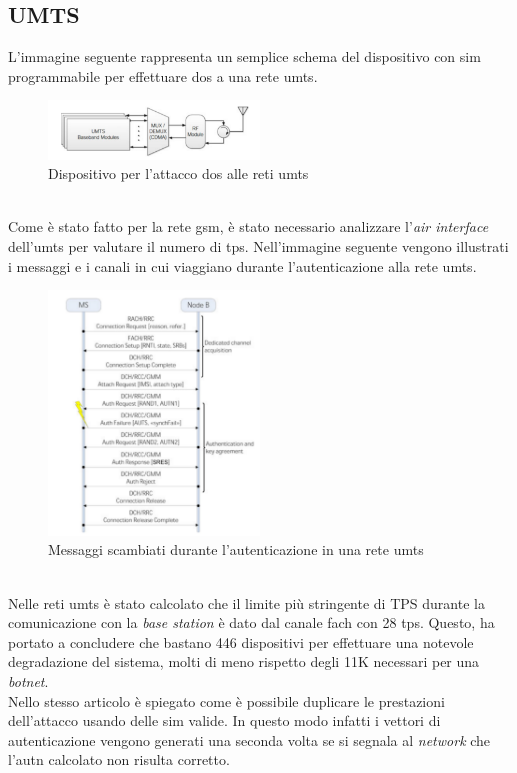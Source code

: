 \subsection{UMTS}
L'immagine seguente rappresenta un semplice schema del dispositivo con \gls{sim} programmabile per effettuare \gls{dos} a una rete \gls{umts}\cite{umts-dos}.
\begin{figure}[h]
    \centering
    \includegraphics[width=0.5\textwidth]{images/umts-dos-device.png}
    \caption{Dispositivo per l'attacco \gls{dos} alle reti \gls{umts}\cite{umts-dos}}
\end{figure}\\
Come è stato fatto per la rete \gls{gsm}, è stato necessario analizzare l'\textit{air interface} dell'\gls{umts} per valutare il numero di \gls{tps}.
Nell'immagine seguente vengono illustrati i messaggi e i canali in cui viaggiano durante l'autenticazione alla rete \gls{umts}.
\begin{figure}[h]
    \centering
    \includegraphics[width=0.5\textwidth]{images/umts-air-channel.png}
    \caption{Messaggi scambiati durante l'autenticazione in una rete \gls{umts}\cite{umts-dos}}
\end{figure}\\
Nelle reti \gls{umts} è stato calcolato che il limite più stringente di TPS durante la comunicazione con la \textit{base station} è dato dal canale \gls{fach} con 28 \gls{tps}.
Questo, ha portato a concludere che bastano 446 dispositivi per effettuare una notevole degradazione del sistema, molti di meno rispetto degli 11K necessari per una \textit{botnet}\cite{dos-imsi}.\\
Nello stesso articolo è spiegato come è possibile duplicare le prestazioni dell'attacco usando delle \gls{sim} valide. In questo modo infatti i vettori di autenticazione vengono generati una seconda volta se si segnala al
\textit{network} che l'\gls{autn} calcolato non risulta corretto.

